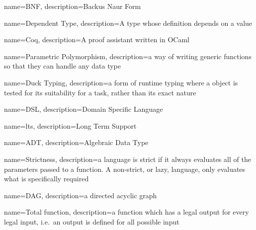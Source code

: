 {%
    name=BNF,
    description={Backus Naur Form}
}

{%
    name={Dependent Type},
    description={A type whose definition depends on a value}
}

{%
    name=Coq,
    description={A proof assistant written in OCaml}
}

{%
    name={Parametric Polymorphism},
    description={a way of writing generic functions so that they can handle any data type}
}

{%
    name={Duck Typing},
    description={a form of runtime typing where a object is tested for its suitability for a task,
    rather than its exact nature}
}

{%
    name={DSL},
    description={Domain Specific Language}
}

{%
    name={lts},
    description={Long Term Support}
}

{%
    name={ADT},
    description={Algebraic Data Type}
}

{%
    name={Strictness},
    description={a language is strict if it always evaluates all of the parameters passed to a
    function. A non-strict, or lazy, language, only evaluates what is specifically required}
}

{%
    name={DAG},
    description={a directed acyclic graph}
}

{%
    name={Total function},
    description={a function which has a legal output for every legal input, i.e.\ an output is
    defined for all possible input}
}
